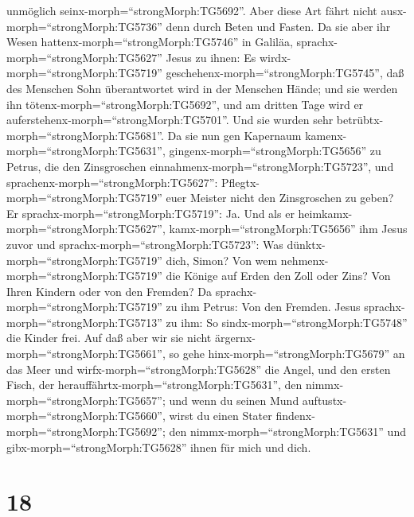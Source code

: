 unmöglich seinx-morph=``strongMorph:TG5692''.  Aber diese
Art fährt nicht ausx-morph=``strongMorph:TG5736'' denn durch Beten und
Fasten.  Da sie aber ihr Wesen
hattenx-morph=``strongMorph:TG5746'' in Galiläa,
sprachx-morph=``strongMorph:TG5627'' Jesus zu ihnen: Es
wirdx-morph=``strongMorph:TG5719''
geschehenx-morph=``strongMorph:TG5745'', daß des Menschen Sohn
überantwortet wird in der Menschen Hände;  und sie werden
ihn tötenx-morph=``strongMorph:TG5692'', und am dritten Tage wird er
auferstehenx-morph=``strongMorph:TG5701''. Und sie wurden sehr
betrübtx-morph=``strongMorph:TG5681''.  Da sie nun gen
Kapernaum kamenx-morph=``strongMorph:TG5631'',
gingenx-morph=``strongMorph:TG5656'' zu Petrus, die den Zinsgroschen
einnahmenx-morph=``strongMorph:TG5723'', und
sprachenx-morph=``strongMorph:TG5627'':
Pflegtx-morph=``strongMorph:TG5719'' euer Meister nicht den Zinsgroschen
zu geben?  Er sprachx-morph=``strongMorph:TG5719'': Ja. Und
als er heimkamx-morph=``strongMorph:TG5627'',
kamx-morph=``strongMorph:TG5656'' ihm Jesus zuvor und
sprachx-morph=``strongMorph:TG5723'': Was
dünktx-morph=``strongMorph:TG5719'' dich, Simon? Von wem
nehmenx-morph=``strongMorph:TG5719'' die Könige auf Erden den Zoll oder
Zins? Von Ihren Kindern oder von den Fremden?  Da
sprachx-morph=``strongMorph:TG5719'' zu ihm Petrus: Von den Fremden.
Jesus sprachx-morph=``strongMorph:TG5713'' zu ihm: So
sindx-morph=``strongMorph:TG5748'' die Kinder frei.  Auf
daß aber wir sie nicht ärgernx-morph=``strongMorph:TG5661'', so gehe
hinx-morph=``strongMorph:TG5679'' an das Meer und
wirfx-morph=``strongMorph:TG5628'' die Angel, und den ersten Fisch, der
herauffährtx-morph=``strongMorph:TG5631'', den
nimmx-morph=``strongMorph:TG5657''; und wenn du seinen Mund
auftustx-morph=``strongMorph:TG5660'', wirst du einen Stater
findenx-morph=``strongMorph:TG5692''; den
nimmx-morph=``strongMorph:TG5631'' und gibx-morph=``strongMorph:TG5628''
ihnen für mich und dich.

\hypertarget{section-17}{%
\section{18}\label{section-17}}

